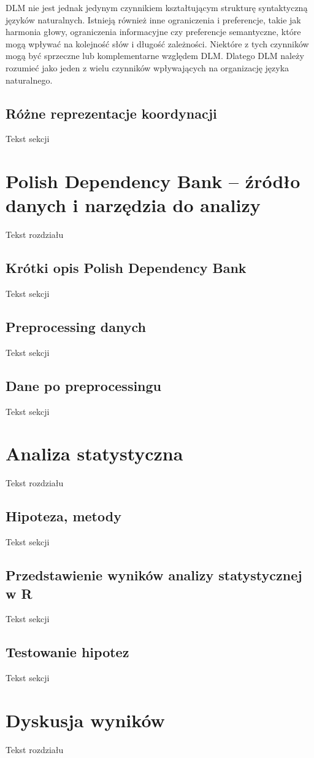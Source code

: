 \documentclass[licencjacka]{pracamgr_Kogni}
\begin{document}
DLM nie jest jednak jedynym czynnikiem kształtującym strukturę syntaktyczną języków naturalnych. Istnieją również inne ograniczenia i preferencje, takie jak harmonia głowy, ograniczenia informacyjne czy preferencje semantyczne, które mogą wpływać na kolejność słów i długość zależności. Niektóre z tych czynników mogą być sprzeczne lub komplementarne względem DLM. Dlatego DLM należy rozumieć jako jeden z wielu czynników wpływających na organizację języka naturalnego.

\section{Różne reprezentacje koordynacji}
Tekst sekcji

\chapter{Polish Dependency Bank -- źródło danych i narzędzia do analizy}
Tekst rozdziału
\section{Krótki opis Polish Dependency Bank}
Tekst sekcji
\section{Preprocessing danych}
Tekst sekcji
\section{Dane po preprocessingu}
Tekst sekcji

\chapter{Analiza statystyczna}
Tekst rozdziału
\section{Hipoteza, metody}
Tekst sekcji
\section{Przedstawienie wyników analizy statystycznej w R}
Tekst sekcji
\section{Testowanie hipotez}
Tekst sekcji

\chapter{Dyskusja wyników}
Tekst rozdziału
\end{document}

